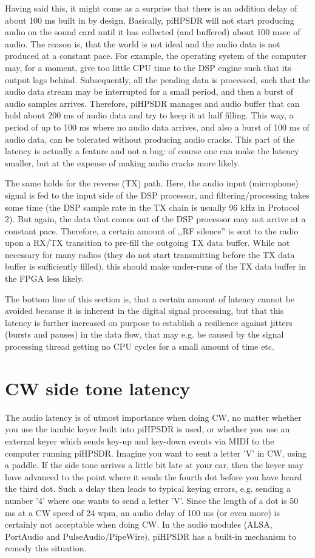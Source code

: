 \documentclass[12pt]{book}
\def\pH{pi\-HPSDR\xspace}
\begin{document}
Having said this, it might come as a surprise that there is an addition delay of about 100 ms
built in by design. Basically, \pH will not start producing audio on the sound card until it has
collected (and buffered) about 100 msec of audio. The reason is, that the world is not ideal and
the audio data is not produced at a constant pace. For example, the operating system of the computer
may, for a moment, give too little CPU time to the DSP engine such that its output lags behind.
Subsequently, all the pending data is processed, such that the audio data stream may be interrupted
for a small period, and then a burst of audio samples arrives. Therefore, \pH manages and audio
buffer that can hold about 200 ms of audio data and try to keep it at half filling. This way,
a period of up to 100 ms where no audio data arrives, and also a burst of 100 ms of audio data,
can be tolerated without producing audio cracks. This part of the latency is actually a feature and
not a bug: of course one can make the latency smaller, but at the expense of making audio cracks
more likely.

The same holds for the reverse (TX) path. Here, the audio input (microphone) signal is fed to
the input side of the DSP processor, and filtering/processing takes some time (the DSP sample
rate in the TX chain is usually 96 kHz in Protocol 2). But again, the data that comes out of
the DSP processor may not arrive at a constant pace. Therefore, a certain amount of ,,RF silence''
is sent to the radio upon a RX/TX transition to pre-fill the outgoing TX data buffer. While not necessary
for many radios (they do not start transmitting before the TX data buffer is sufficiently filled),
this should make under-runs of the TX data buffer in the FPGA less likely.

The bottom line of this section is, that a certain amount of latency cannot be avoided
because it is inherent in the digital signal processing, but that this latency is further
increased on purpose to establish a resilience against jitters (bursts and pauses)
in the data flow,
that may e.g. be caused by the signal processing thread getting no CPU cycles for a small
amount of time etc.

\section{CW side tone latency}
\label{sec:cwlatency}
The audio latency is of utmost importance when doing CW, no matter whether you use
the iambic keyer built into \pH is used, or whether you use an external keyer which
sends key-up and key-down events via MIDI to the computer running \pH.
Imagine you want to sent a letter 'V' in CW,
using a paddle. If the side tone arrives a little bit late at your ear, then the keyer
may have advanced to the point where it sends the fourth dot before you have heard
the third dot. Such a delay then leads to typical keying errors, e.g. sending a number '4' where
one wants to send a letter 'V'. Since the length of a dot is 50 ms at a CW speed of 24 wpm,
an audio delay of 100 ms (or even more) is certainly not acceptable when doing CW.
In the audio modules (ALSA, PortAudio and PulseAudio/PipeWire),
 \pH has a built-in mechanism to remedy this situation.
\end{document}
